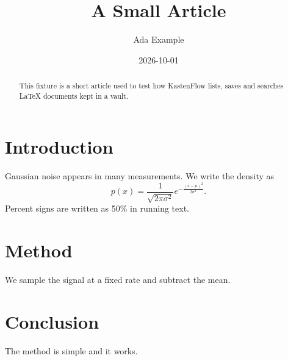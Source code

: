 \documentclass[11pt]{article}
\title{A Small Article}
\author{Ada Example}
\date{2026-10-01}
\begin{document}
\maketitle

\begin{abstract}
This fixture is a short article used to test how KastenFlow lists, saves and
searches LaTeX documents kept in a vault.
\end{abstract}

\section{Introduction}
Gaussian noise appears in many measurements. We write the density as
\begin{equation}
  p(x) = \frac{1}{\sqrt{2\pi\sigma^2}} e^{-\frac{(x-\mu)^2}{2\sigma^2}}.
\end{equation}
Percent signs are written as 50\% in running text.

\section{Method}
We sample the signal at a fixed rate and subtract the mean.

\section{Conclusion}
The method is simple and it works.
\end{document}
